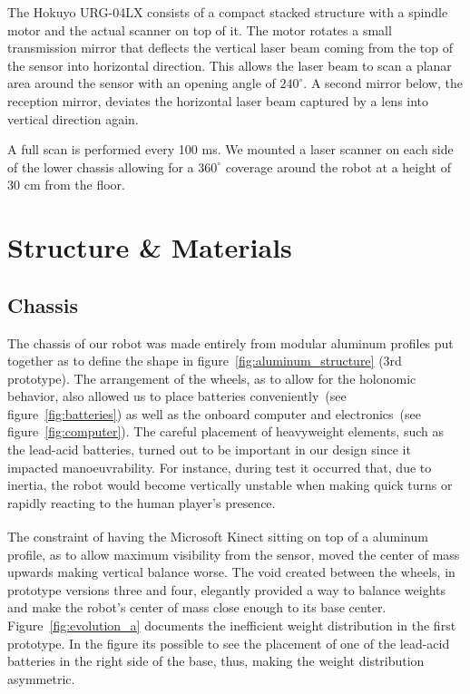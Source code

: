 The Hokuyo URG-04LX consists of a compact stacked structure with a spindle motor and the actual scanner on top of it. The motor rotates a small transmission mirror that deflects the vertical laser beam coming from the top of the sensor into horizontal direction. This allows the laser beam to scan a planar area around the sensor with an opening angle of $240^\circ$. A second mirror below, the reception mirror, deviates the horizontal laser beam captured by a lens into vertical direction again.


A full scan is performed every 100 ms. We mounted a laser scanner on each side of the lower chassis allowing for a $360^\circ$ coverage around the robot at a height of 30 cm from the floor.

\section{Structure \& Materials}
\subsection{Chassis}
The chassis of our robot was made entirely from modular aluminum profiles put together as to define the shape in figure~\ref{fig:aluminum_structure} (3rd prototype). The arrangement of the wheels, as to allow for the holonomic behavior, also allowed us to place batteries conveniently~(see figure~\ref{fig:batteries}) as well as the onboard computer and electronics~(see figure~\ref{fig:computer}). The careful placement of heavyweight elements, such as the lead-acid batteries, turned out to be important in our design since it impacted manoeuvrability. For instance, during test it occurred that, due to inertia, the robot would become vertically unstable when making quick turns or rapidly reacting to the human player's presence. 

The constraint of having the Microsoft Kinect\textsuperscript{\textregistered} sitting on top of a aluminum profile, as to allow maximum visibility from the sensor, moved the center of mass upwards making vertical balance worse. The void created between the wheels, in prototype versions three and four, elegantly provided a way to balance weights and make the robot's center of mass close enough to its base center. Figure~\ref{fig:evolution_a} documents the inefficient weight distribution in the first prototype. In the figure its possible to see the placement of one of the lead-acid batteries in the right side of the base, thus, making the weight distribution asymmetric.

